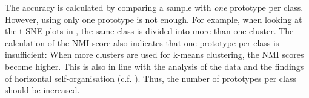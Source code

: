 The accuracy is calculated by comparing a sample with \emph{one} prototype per class. However, using only one prototype is not enough. For example, when looking at the t-SNE plots in , the same class is divided into more than one cluster. The calculation of the NMI score also indicates that one prototype per class is insufficient: When more clusters are used for k-means clustering, the NMI scores become higher. This is also in line with the analysis of the data and the findings of horizontal self-organisation (c.f. ). Thus, the number of prototypes per class should be increased.






